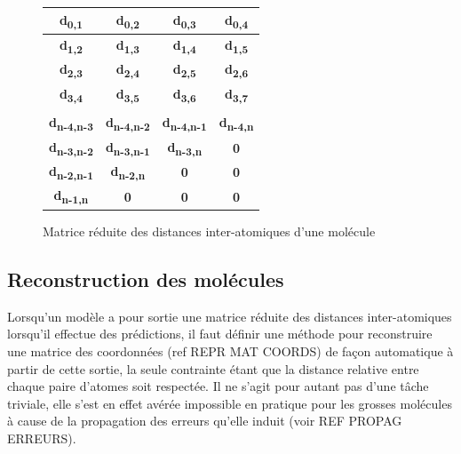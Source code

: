 \begin{figure}[h!]
	\centering
	
	
	\begin{tabular}{|c|c|c|c|}
		\hline
		\textbf{d\textsubscript{0,1}} & \textbf{d\textsubscript{0,2}} & \textbf{d\textsubscript{0,3}} & \textbf{d\textsubscript{0,4}} \\ \hline
		\textbf{d\textsubscript{1,2}} & \textbf{d\textsubscript{1,3}} & \textbf{d\textsubscript{1,4}} & \textbf{d\textsubscript{1,5}} \\ \hline
		\textbf{d\textsubscript{2,3}} & \textbf{d\textsubscript{2,4}} & \textbf{d\textsubscript{2,5}} & \textbf{d\textsubscript{2,6}} \\ \hline
		\textbf{d\textsubscript{3,4}} & \textbf{d\textsubscript{3,5}} & \textbf{d\textsubscript{3,6}} & \textbf{d\textsubscript{3,7}} \\ \hline
		\textbf{\rot{... }} & \textbf{\rot{... }} & \textbf{\rot{... }} & \textbf{\rot{... }} \\ \hline
		\textbf{d\textsubscript{n-4,n-3}} & \textbf{d\textsubscript{n-4,n-2}} & \textbf{d\textsubscript{n-4,n-1}} & \textbf{d\textsubscript{n-4,n}} \\ \hline
		\textbf{d\textsubscript{n-3,n-2}} & \textbf{d\textsubscript{n-3,n-1}} & \textbf{d\textsubscript{n-3,n}} & \textbf{0} \\ \hline
		\textbf{d\textsubscript{n-2,n-1}} & \textbf{d\textsubscript{n-2,n}} & \textbf{0} & \textbf{0} \\ \hline
		\textbf{d\textsubscript{n-1,n}} & \textbf{0} & \textbf{0} & \textbf{0} \\ \hline
	\end{tabular}

	
	\caption{Matrice réduite des distances inter-atomiques d'une molécule}
\end{figure}

\newpage
\subsection{Reconstruction des molécules}

\par Lorsqu'un modèle a pour sortie une matrice réduite des distances inter-atomiques lorsqu'il effectue des prédictions, il faut définir une méthode pour reconstruire une matrice des coordonnées (ref REPR MAT COORDS) de façon automatique à partir de cette sortie, la seule contrainte étant que la distance relative entre chaque paire d'atomes soit respectée. Il ne s'agit pour autant pas d'une tâche triviale, elle s'est en effet avérée impossible en pratique pour les grosses molécules à cause de la propagation des erreurs qu'elle induit (voir REF PROPAG ERREURS).

